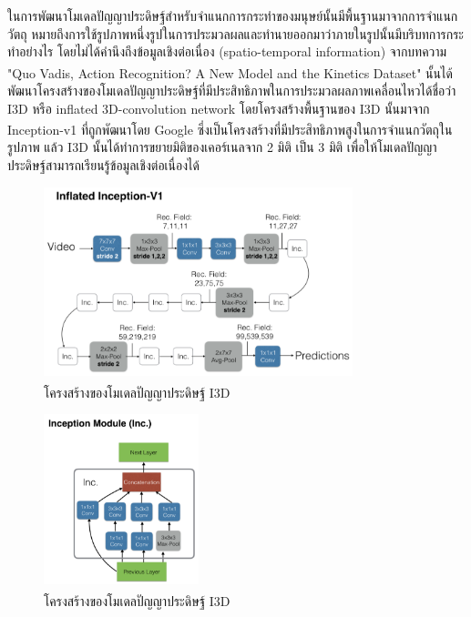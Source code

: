 ในการพัฒนาโมเดลปัญญาประดิษฐ์สำหรับจำแนกการกระทำของมนุษย์นั้นมีพื้นฐานมาจากการจำแนกวัตถุ หมายถึงการใช้รูปภาพหนึ่งรูปในการประมวลผลและทำนายออกมาว่าภายในรูปนั้นมีบริบทการกระทำอย่างไร 
โดยไม่ได้คำนึงถึงข้อมูลเชิงต่อเนื่อง (spatio-temporal information) จากบทความ "Quo Vadis, Action Recognition? A New Model and the Kinetics Dataset"\textsuperscript{\cite{I3D}} 
นั้นได้พัฒนาโครงสร้างของโมเดลปัญญาประดิษฐ์ที่มีประสิทธิภาพในการประมวลผลภาพเคลื่อนไหวได้ชื่อว่า I3D หรือ inflated 3D-convolution network
โดยโครงสร้างพื้นฐานของ I3D นั้นมาจาก Inception-v1\textsuperscript{\cite{szegedy2015going}} ที่ถูกพัฒนาโดย Google ซึ่งเป็นโครงสร้างที่มีประสิทธิภาพสูงในการจำแนกวัตถุในรูปภาพ
แล้ว I3D นั้นได้ทำการขยายมิติของเคอร์เนลจาก 2 มิติ เป็น 3 มิติ เพื่อให้โมเดลปัญญาประดิษฐ์สามารถเรียนรู้ข้อมูลเชิงต่อเนื่องได้
\begin{figure}[!ht]
    \centering
    \includegraphics[width=0.8\textwidth]{chapter2/images/I3D.png}
    \caption[โครงสร้างของโมเดลปัญญาประดิษฐ์ I3D]{โครงสร้างของโมเดลปัญญาประดิษฐ์ I3D\textsuperscript{\cite{I3D}}}
    \label{fig:I3DArch}
\end{figure}
\begin{figure}[!ht]
    \centering
    \includegraphics[width=0.4\textwidth]{chapter2/images/inceptionModule.png}
    \caption[โครงสร้างของโมเดลปัญญาประดิษฐ์ I3D]{โครงสร้างของโมเดลปัญญาประดิษฐ์ I3D\textsuperscript{\cite{I3D}}}
    \label{fig:InceptionModule}
\end{figure}
